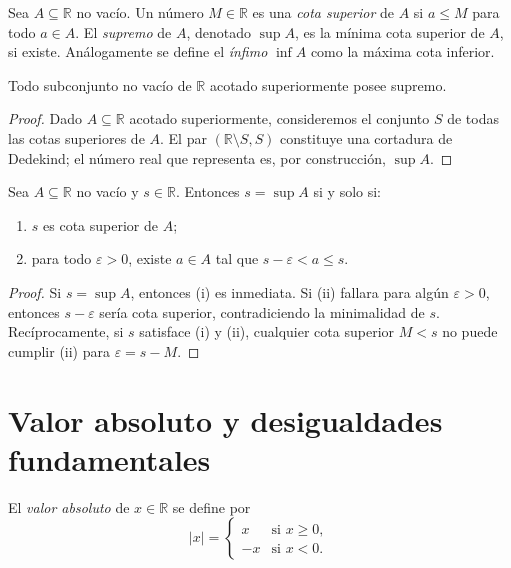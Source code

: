 \begin{definition}
\label{def:supremo}
Sea $A\subseteq\mathbb{R}$ no vacío. Un número $M\in\mathbb{R}$ es una \emph{cota superior} de $A$ si $a\leq M$ para todo $a\in A$. El \emph{supremo} de $A$, denotado $\sup A$, es la mínima cota superior de $A$, si existe. Análogamente se define el \emph{ínfimo} $\inf A$ como la máxima cota inferior.
\end{definition}

\begin{theorem}
\label{teo:completitud-dedekind}
Todo subconjunto no vacío de $\mathbb{R}$ acotado superiormente posee supremo.
\end{theorem}

\begin{proof}
Dado $A\subseteq\mathbb{R}$ acotado superiormente, consideremos el conjunto $S$ de todas las cotas superiores de $A$. El par $(\mathbb{R}\setminus S, S)$ constituye una cortadura de Dedekind; el número real que representa es, por construcción, $\sup A$.
\end{proof}

\begin{theorem}
\label{teo:carac-sup}
Sea $A\subseteq\mathbb{R}$ no vacío y $s\in\mathbb{R}$. Entonces $s=\sup A$ si y solo si:
\begin{enumerate}
  \item[(i)] $s$ es cota superior de $A$;
  \item[(ii)] para todo $\varepsilon>0$, existe $a\in A$ tal que $s-\varepsilon<a\leq s$.
\end{enumerate}
\end{theorem}

\begin{proof}
Si $s=\sup A$, entonces (i) es inmediata. Si (ii) fallara para algún $\varepsilon>0$, entonces $s-\varepsilon$ sería cota superior, contradiciendo la minimalidad de $s$. Recíprocamente, si $s$ satisface (i) y (ii), cualquier cota superior $M<s$ no puede cumplir (ii) para $\varepsilon=s-M$.
\end{proof}

\section{Valor absoluto y desigualdades fundamentales}

\begin{definition}
\label{def:valor-absoluto}
El \emph{valor absoluto} de $x\in\mathbb{R}$ se define por
\[
  |x|=\begin{cases}x & \text{si }x\geq 0,\\ -x & \text{si }x<0.\end{cases}
\]
\end{definition}

